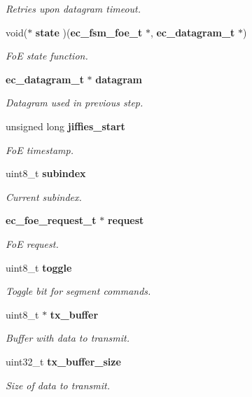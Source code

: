 \begin{DoxyCompactItemize}
\begin{DoxyCompactList}\small\item\em Retries upon datagram timeout. \end{DoxyCompactList}\item 
void($\ast$ {\bf state} )({\bf ec\-\_\-fsm\-\_\-foe\-\_\-t} $\ast$, {\bf ec\-\_\-datagram\-\_\-t} $\ast$)
\begin{DoxyCompactList}\small\item\em Fo\-E state function. \end{DoxyCompactList}\item 
{\bf ec\-\_\-datagram\-\_\-t} $\ast$ {\bf datagram}
\begin{DoxyCompactList}\small\item\em Datagram used in previous step. \end{DoxyCompactList}\item 
unsigned long {\bf jiffies\-\_\-start}
\begin{DoxyCompactList}\small\item\em Fo\-E timestamp. \end{DoxyCompactList}\item 
uint8\-\_\-t {\bf subindex}
\begin{DoxyCompactList}\small\item\em Current subindex. \end{DoxyCompactList}\item 
{\bf ec\-\_\-foe\-\_\-request\-\_\-t} $\ast$ {\bf request}
\begin{DoxyCompactList}\small\item\em Fo\-E request. \end{DoxyCompactList}\item 
uint8\-\_\-t {\bf toggle}
\begin{DoxyCompactList}\small\item\em Toggle bit for segment commands. \end{DoxyCompactList}\item 
uint8\-\_\-t $\ast$ {\bf tx\-\_\-buffer}
\begin{DoxyCompactList}\small\item\em Buffer with data to transmit. \end{DoxyCompactList}\item 
uint32\-\_\-t {\bf tx\-\_\-buffer\-\_\-size}
\begin{DoxyCompactList}\small\item\em Size of data to transmit. \end{DoxyCompactList}\item 

\end{DoxyCompactItemize}
